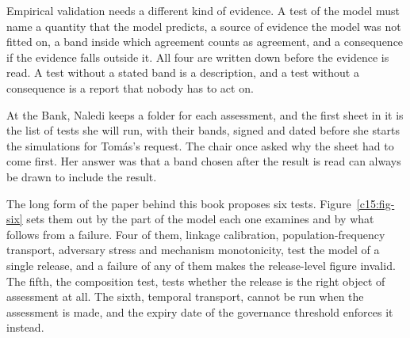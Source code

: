 Empirical validation needs a different kind of evidence. A test of the model must
name a quantity that the model predicts, a source of evidence the model was not
fitted on, a band inside which agreement counts as agreement, and a consequence if
the evidence falls outside it. All four are written down before the evidence is
read. A test without a stated band is a description, and a test without a
consequence is a report that nobody has to act on.

At the Bank, Naledi keeps a folder for each assessment, and the first sheet in it
is the list of tests she will run, with their bands, signed and dated before she
starts the simulations for Tomás's request. The chair once asked why the sheet
had to come first. Her answer was that a band chosen after the result is read can
always be drawn to include the result.

The long form of the paper behind this book proposes six tests. Figure~\ref{c15:fig-six} sets them out by the part
of the model each one examines and by what follows from a failure. Four of them,
linkage calibration, population-frequency transport, adversary stress and
mechanism monotonicity, test the model of a single release, and a failure of any
of them makes the release-level figure invalid. The fifth, the composition test,
tests whether the release is the right object of assessment at all. The sixth,
temporal transport, cannot be run when the assessment is made, and the expiry date
of the governance threshold enforces it instead.

